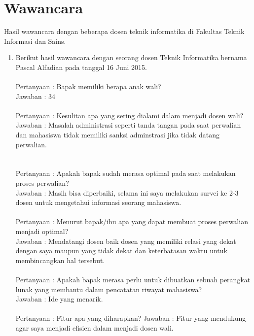 \chapter{Wawancara}
\label{wawancara}

Hasil wawancara dengan beberapa dosen teknik informatika di Fakultas Teknik Informasi dan Sains.

\begin{enumerate}
\item Berikut hasil wawancara dengan seorang dosen Teknik Informatika bernama Pascal Alfadian pada tanggal 16 Juni 2015.\\\\
Pertanyaan : Bapak memiliki berapa anak wali?\\
Jawaban : 34\\\\
Pertanyaan : Kesulitan apa yang sering dialami dalam menjadi dosen wali?\\
Jawaban : Masalah administrasi seperti tanda tangan pada saat perwalian dan mahasiswa tidak memiliki sanksi adminstrasi jika tidak datang perwalian.\\\\\\
Pertanyaan : Apakah bapak sudah merasa optimal pada saat melakukan proses perwalian?\\
Jawaban : Masih bisa diperbaiki, selama ini saya melakukan survei ke 2-3 dosen untuk mengetahui informasi seorang mahasiswa.\\\\
Pertanyaan : Menurut bapak/ibu apa yang dapat membuat proses perwalian menjadi optimal?\\
Jawaban : Mendatangi dosen baik dosen yang memiliki relasi yang dekat dengan saya maupun yang tidak dekat dan keterbatasan waktu untuk membincangkan hal tersebut.\\\\
Pertanyaan : Apakah bapak merasa perlu untuk dibuatkan sebuah perangkat lunak yang membantu dalam pencatatan riwayat mahasiswa?\\
Jawaban : Ide yang menarik.\\\\
Pertanyaan : Fitur apa yang diharapkan?
Jawaban : Fitur yang mendukung agar saya menjadi efisien dalam menjadi dosen wali.\\


\end{enumerate}
